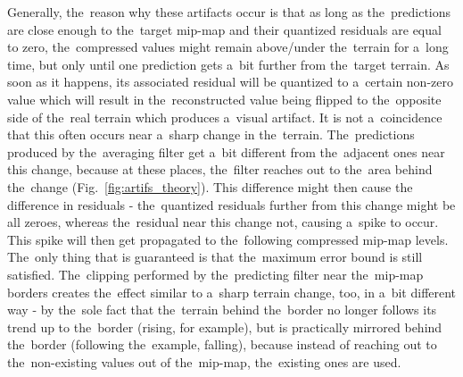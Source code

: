 Generally, the~reason why these artifacts occur is that as long as the~predictions are close enough to the~target mip-map and their quantized residuals are equal to zero, the~compressed values might remain above/under the~terrain for a~long time, but only until one prediction gets a~bit further from the~target terrain. As soon as it happens, its associated residual will be quantized to a~certain non-zero value which will result in the~reconstructed value being flipped to the~opposite side of the~real terrain which produces a~visual artifact. It is not a~coincidence that this often occurs near a~sharp change in the~terrain. The~predictions produced by the~averaging filter get a~bit different from the~adjacent ones near this change, because at these places, the~filter reaches out to the~area behind the~change (Fig.~\ref{fig:artifs_theory}). This difference might then cause the difference in residuals - the~quantized residuals further from this change might be all zeroes, whereas the~residual near this change not, causing a~spike to occur. This spike will then get propagated to the~following compressed mip-map levels. The~only thing that is guaranteed is that the~maximum error bound is still satisfied. The~clipping performed by the~predicting filter near the~mip-map borders creates the~effect similar to a~sharp terrain change, too, in a~bit different way - by the~sole fact that the~terrain behind the~border no longer follows its trend up to the~border (rising, for example), but is practically mirrored behind the~border (following the~example, falling), because instead of reaching out to the~non-existing values out of the~mip-map, the~existing ones are used.

